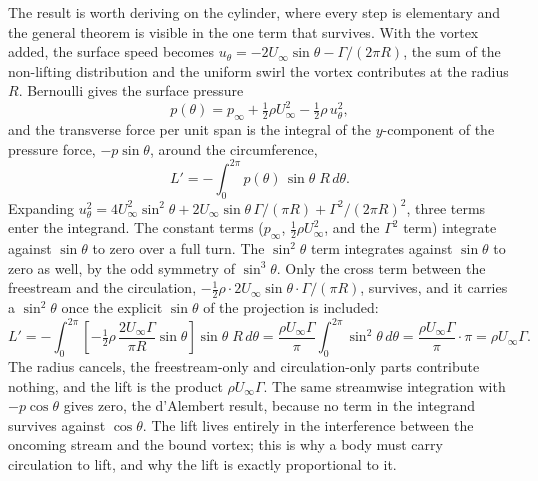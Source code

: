 The result is worth deriving on the cylinder, where every step is
elementary and the general theorem is visible in the one term that
survives. With the vortex added, the surface speed becomes
$u_\theta = -2U_\infty\sin\theta - \Gamma/(2\pi R)$, the sum of the
non-lifting distribution and the uniform swirl the vortex contributes
at the radius $R$. Bernoulli gives the surface pressure
\[
p(\theta) = p_\infty + \tfrac12\rho U_\infty^2
- \tfrac12\rho\,u_\theta^2,
\]
and the transverse force per unit span is the integral of the
$y$-component of the pressure force, $-p\sin\theta$, around the
circumference,
\[
L' = -\int_0^{2\pi} p(\theta)\,\sin\theta\;R\,d\theta.
\]
Expanding $u_\theta^2 = 4U_\infty^2\sin^2\theta
+ 2U_\infty\sin\theta\,\Gamma/(\pi R) + \Gamma^2/(2\pi R)^2$, three
terms enter the integrand. The constant terms ($p_\infty$,
$\tfrac12\rho U_\infty^2$, and the $\Gamma^2$ term) integrate against
$\sin\theta$ to zero over a full turn. The $\sin^2\theta$ term
integrates against $\sin\theta$ to zero as well, by the odd symmetry of
$\sin^3\theta$. Only the cross term between the freestream and the
circulation, $-\tfrac12\rho\cdot 2U_\infty\sin\theta\cdot
\Gamma/(\pi R)$, survives, and it carries a $\sin^2\theta$ once the
explicit $\sin\theta$ of the projection is included:
\[
L' = -\int_0^{2\pi}\left[-\tfrac12\rho\,\frac{2U_\infty\Gamma}{\pi R}
\sin\theta\right]\sin\theta\;R\,d\theta
= \frac{\rho U_\infty\Gamma}{\pi}\int_0^{2\pi}\sin^2\theta\,d\theta
= \frac{\rho U_\infty\Gamma}{\pi}\cdot\pi
= \rho U_\infty\Gamma.
\]
The radius cancels, the freestream-only and circulation-only parts
contribute nothing, and the lift is the product $\rho U_\infty\Gamma$.
The same streamwise integration with $-p\cos\theta$ gives zero, the
d'Alembert result, because no term in the integrand survives against
$\cos\theta$. The lift lives entirely in the interference between the
oncoming stream and the bound vortex; this is why a body must carry
circulation to lift, and why the lift is exactly proportional to it.

